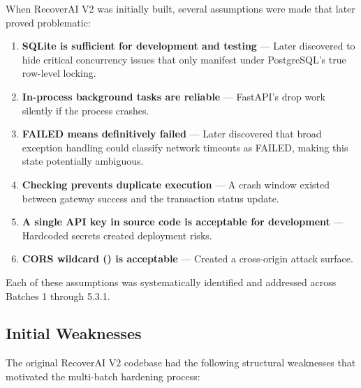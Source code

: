 \begin{tcolorbox}[warningbox={\iconWarning[1.3] Assumptions That Existed at the Beginning}]
\color{textdark}
When RecoverAI V2 was initially built, several assumptions were made that later proved problematic:

\begin{enumerate}
    \item \textbf{SQLite is sufficient for development and testing} --- Later discovered to hide critical concurrency issues that only manifest under PostgreSQL's true row-level locking.
    \item \textbf{In-process background tasks are reliable} --- FastAPI's  drop work silently if the process crashes.
    \item \textbf{FAILED means definitively failed} --- Later discovered that broad exception handling could classify network timeouts as FAILED, making this state potentially ambiguous.
    \item \textbf{Checking  prevents duplicate execution} --- A crash window existed between gateway success and the transaction status update.
    \item \textbf{A single API key in source code is acceptable for development} --- Hardcoded secrets created deployment risks.
    \item \textbf{CORS wildcard (\code{*}) is acceptable} --- Created a cross-origin attack surface.
\end{enumerate}

Each of these assumptions was systematically identified and addressed across Batches 1 through 5.3.1.
\end{tcolorbox}

\vspace{0.5cm}

\subsection{Initial Weaknesses}

The original RecoverAI V2 codebase had the following structural weaknesses that motivated the multi-batch hardening process:

